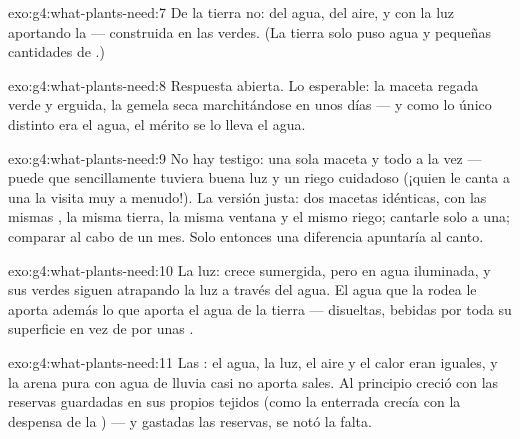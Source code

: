 \begin{solution}{exo:g4:what-plants-need:7}
De la tierra no: del agua, del aire, y con la luz aportando la
 --- construida en las  verdes. (La tierra solo puso agua
y pequeñas cantidades de .)
\end{solution}

\begin{solution}{exo:g4:what-plants-need:8}
Respuesta abierta. Lo esperable: la maceta regada verde y erguida, la
gemela seca marchitándose en unos días --- y como lo único distinto
era el agua, el mérito se lo lleva el agua.
\end{solution}

\begin{solution}{exo:g4:what-plants-need:9}
No hay testigo: una sola maceta y todo a la vez --- puede que
sencillamente tuviera buena luz y un riego cuidadoso (¡quien le canta
a una  la visita muy a menudo!). La versión justa: dos macetas
idénticas, con las mismas , la misma tierra, la misma ventana
y el mismo riego; cantarle solo a una; comparar al cabo de un mes.
Solo entonces una diferencia apuntaría al canto.
\end{solution}

\begin{solution}{exo:g4:what-plants-need:10}
La luz: crece sumergida, pero en agua iluminada, y sus  verdes
siguen atrapando la luz a través del agua. El agua que la rodea le
aporta además lo que aporta el agua de la tierra --- 
disueltas, bebidas por toda su superficie en vez de por unas .
\end{solution}

\begin{solution}{exo:g4:what-plants-need:11}
Las : el agua, la luz, el aire y el calor eran iguales,
y la arena pura con agua de lluvia casi no aporta sales. Al principio
creció con las reservas guardadas en sus propios tejidos (como la
 enterrada crecía con la despensa de la ) --- y
gastadas las reservas, se notó la falta.
\end{solution}
